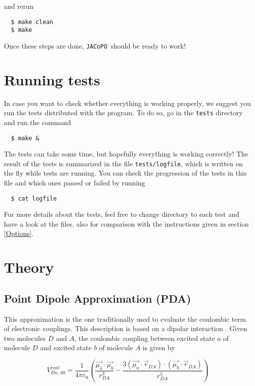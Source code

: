 \documentclass[a4paper]{article}
\newcommand{\jacopo}{\texttt{JACoPO}}
\begin{document}
and rerun

\begin{verbatim}
  $ make clean
  $ make 
\end{verbatim}

Once these steps are done, \jacopo\ should be ready to work!

\section{Running tests}

In case you want to check whether everything is working properly, we suggest you run the tests distributed with the program.
To do so, go in the \verb|tests| directory and run the command

\begin{verbatim}
  $ make &
\end{verbatim}

The tests can take some time, but hopefully everything is working correctly! The result of the tests is summarized in the file \verb|tests/logfile|, which is written on the fly while tests are running. You can check the progression of the tests in this file and which ones passed or failed by running

\begin{verbatim}
  $ cat logfile
\end{verbatim}

For more details about the tests, feel free to change directory to each test and have a look at the files, also for comparison with the instructions given in section \ref{Options}.

\section{Theory}
\subsection*{Point Dipole Approximation (PDA)}
This approximation is the one traditionally used to evaluate the coulombic term of electronic couplings. This description is based on a dipolar interaction \cite{PDA}.  Given two molecules $D$ and $A$, the coulombic coupling between excited state $a$ of molecule $D$ and excited state $b$ of molecule $A$ is given by

\begin{equation}
 V^{coul}_{Da,Ab} = \frac{1}{4\pi\varepsilon_0} \left( \frac{\vec{\mu_a}\cdot\vec{\mu_b}}{r_{DA}^3} - \frac{3(\vec{\mu_a}\cdot \vec{r}_{DA})\cdot(\vec{\mu_b}\cdot\vec{r}_{DA})}{r_{DA}^5} \right)
 \label{eq:PDA}
\end{equation}
\end{document}
